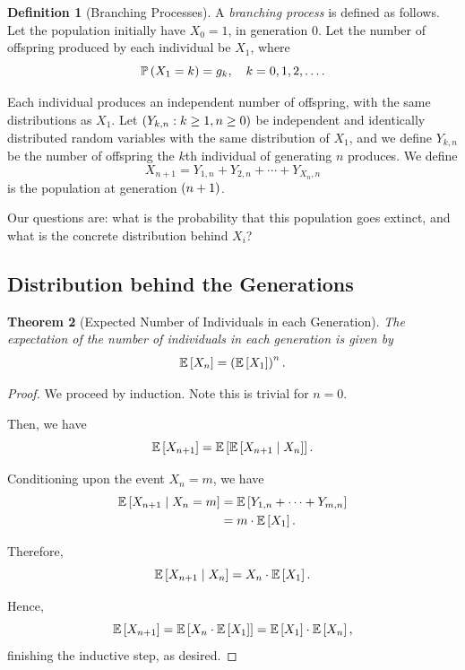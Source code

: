\documentclass{article}
\newtheorem{theorem}{Theorem}[section]
\theoremstyle{definition}
\newtheorem{definition}[theorem]{Definition}
\theoremstyle{remark}
\newcommand{\Prob}{\mathbb{P}}
\newcommand{\Expt}{\mathbb{E}}
\newcommand{\Conditional}[2]{#1\mid #2}
\begin{document}
\begin{definition}[Branching Processes]
    \label{def:branching-process}%
    A \emph{branching process} is defined as follows. Let the population initially have \(X_0 = 1\), in generation \(0\). Let the number of offspring produced by each individual be \(X_1\), where
    \[
        \Prob\pqty{X_1 = k} = g_k, \quad k = 0, 1, 2, \ldots.
    \]

    Each individual produces an independent number of offspring, with the same distributions as \(X_1\). Let \(\left(Y_{k, n} : k \geq 1, n \geq 0\right)\) be independent and identically distributed random variables with the same distribution of \(X_1\), and we define \(Y_{k, n}\) be the number of offspring the \(k\)th individual of generating \(n\) produces. We define
    \[
        X_{n + 1} = Y_{1, n} + Y_{2, n} + \cdots + Y_{X_n, n}
    \]
    is the population at generation \(\left(n + 1\right)\).
\end{definition}

Our questions are: what is the probability that this population goes extinct, and what is the concrete distribution behind \(X_i\)?

\subsection{Distribution behind the Generations}

\begin{theorem}[Expected Number of Individuals in each Generation]
    \label{thm:branching-process-expt-generation}%
    The expectation of the number of individuals in each generation is given by
    \[
        \Expt\bqty{X_n} = \pqty{\Expt\bqty{X_1}}^{n}.
    \]
\end{theorem}

\begin{proof}
    We proceed by induction. Note this is trivial for \(n = 0\).

    Then, we have
    \[
        \Expt\bqty{X_{n + 1}} = \Expt\bqty{\Expt\bqty{\Conditional{X_{n + 1}}{X_n}}}.
    \]

    Conditioning upon the event \(X_n = m\), we have
    \begin{align*}
        \Expt\bqty{\Conditional{X_{n + 1}}{X_{n} = m}} &= \Expt\bqty{Y_{1, n} + \cdots + Y_{m, n}} \\
        &= m \cdot \Expt\bqty{X_1}.
    \end{align*}

    Therefore,
    \[
        \Expt\bqty{\Conditional{X_{n + 1}}{X_n}} = X_n \cdot \Expt\bqty{X_1}.
    \]

    Hence,
    \[
        \Expt\bqty{X_{n + 1}} = \Expt\bqty{X_n \cdot \Expt\bqty{X_1}} = \Expt\bqty{X_1} \cdot \Expt\bqty{X_n},
    \]
    finishing the inductive step, as desired.
\end{proof}
\end{document}
